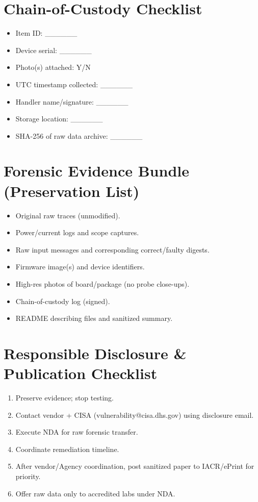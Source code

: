 \documentclass[11pt, a4paper]{article}
\begin{document}
\section{Chain-of-Custody Checklist}
\begin{itemize}
    \item Item ID: \_\_\_\_\_\_
    \item Device serial: \_\_\_\_\_\_
    \item Photo(s) attached: Y/N
    \item UTC timestamp collected: \_\_\_\_\_\_
    \item Handler name/signature: \_\_\_\_\_\_
    \item Storage location: \_\_\_\_\_\_
    \item SHA-256 of raw data archive: \_\_\_\_\_\_
\end{itemize}

\section{Forensic Evidence Bundle (Preservation List)}
\begin{itemize}
    \item Original raw traces (unmodified).
    \item Power/current logs and scope captures.
    \item Raw input messages and corresponding correct/faulty digests.
    \item Firmware image(s) and device identifiers.
    \item High-res photos of board/package (no probe close-ups).
    \item Chain-of-custody log (signed).
    \item README describing files and sanitized summary.
\end{itemize}

\section{Responsible Disclosure \& Publication Checklist}
\begin{enumerate}
    \item Preserve evidence; stop testing.
    \item Contact vendor + CISA (vulnerability@cisa.dhs.gov) using disclosure email.
    \item Execute NDA for raw forensic transfer.
    \item Coordinate remediation timeline.
    \item After vendor/Agency coordination, post sanitized paper to IACR/ePrint for priority.
    \item Offer raw data only to accredited labs under NDA.
\end{enumerate}
\end{document}

